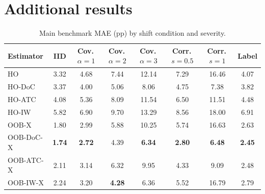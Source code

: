 \section{Additional results}
\begin{table}[h]
\centering\small
\caption{Main benchmark MAE (pp) by shift condition and severity.}
\label{tab:levels}
\begin{tabular}{lccccccc}
\toprule
Estimator & IID & Cov.\,$\alpha{=}1$ & Cov.\,$\alpha{=}2$ & Cov.\,$\alpha{=}3$ & Corr.\,$s{=}0.5$ & Corr.\,$s{=}1$ & Label \\
\midrule
HO & 3.32 & 4.68 & 7.44 & 12.14 & 7.29 & 16.46 & 4.07 \\
HO\mbox{-}DoC & 3.37 & 4.00 & 5.06 & 8.06 & 4.75 & 7.38 & 3.82 \\
HO\mbox{-}ATC & 4.08 & 5.36 & 8.09 & 11.54 & 6.50 & 11.51 & 4.48 \\
HO\mbox{-}IW & 5.82 & 6.90 & 9.70 & 13.29 & 8.56 & 18.00 & 6.91 \\
OOB\mbox{-}X & 1.80 & 2.99 & 5.88 & 10.25 & 5.74 & 16.63 & 2.63 \\
OOB\mbox{-}DoC\mbox{-}X & \textbf{1.74} & \textbf{2.72} & 4.39 & \textbf{6.34} & \textbf{2.80} & \textbf{6.48} & \textbf{2.45} \\
OOB\mbox{-}ATC\mbox{-}X & 2.11 & 3.14 & 6.32 & 9.95 & 4.33 & 9.09 & 2.48 \\
OOB\mbox{-}IW\mbox{-}X & 2.24 & 3.20 & \textbf{4.28} & 6.36 & 5.52 & 16.79 & 2.79 \\
\bottomrule
\end{tabular}
\end{table}
